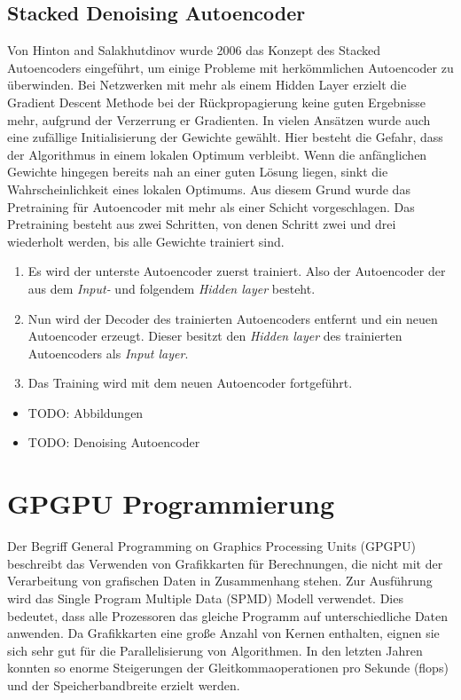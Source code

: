 \subsection{Stacked Denoising Autoencoder}

Von Hinton and Salakhutdinov wurde 2006 das Konzept des Stacked Autoencoders eingeführt, um einige Probleme mit herkömmlichen Autoencoder zu überwinden. Bei Netzwerken mit mehr als einem Hidden Layer erzielt die Gradient Descent Methode bei der Rückpropagierung keine guten Ergebnisse mehr, aufgrund der Verzerrung er Gradienten. In vielen Ansätzen wurde auch eine zufällige Initialisierung der Gewichte gewählt. Hier besteht die Gefahr, dass der Algorithmus in einem lokalen Optimum verbleibt. Wenn die anfänglichen Gewichte hingegen bereits nah an einer guten Lösung liegen, sinkt die Wahrscheinlichkeit eines lokalen Optimums. Aus diesem Grund wurde das Pretraining für Autoencoder mit mehr als einer Schicht vorgeschlagen. Das Pretraining besteht aus zwei Schritten, von denen Schritt zwei und drei wiederholt werden, bis alle Gewichte trainiert sind.

\begin{enumerate}
	\item Es wird der unterste Autoencoder zuerst trainiert. Also der Autoencoder der aus dem \textit{Input-} und folgendem \textit{Hidden layer} besteht.
	\item Nun wird der Decoder des trainierten Autoencoders entfernt und ein neuen Autoencoder erzeugt. Dieser besitzt den \textit{Hidden layer} des trainierten Autoencoders als \textit{Input layer}.
	\item Das Training wird mit dem neuen Autoencoder fortgeführt.
\end{enumerate}

\cite{sda2010}

\begin{itemize}
	\item TODO: Abbildungen
	\item TODO: Denoising Autoencoder
\end{itemize}

\section{GPGPU Programmierung}

Der Begriff General Programming on Graphics Processing Units (GPGPU) beschreibt das Verwenden von Grafikkarten für Berechnungen, die nicht mit der Verarbeitung von grafischen Daten in Zusammenhang stehen. Zur Ausführung wird das Single Program Multiple Data (SPMD) Modell verwendet. Dies bedeutet, dass alle Prozessoren das gleiche Programm auf unterschiedliche Daten anwenden. Da Grafikkarten eine große Anzahl von Kernen enthalten, eignen sie sich sehr gut für die Parallelisierung von Algorithmen. In den letzten Jahren konnten so enorme Steigerungen der Gleitkommaoperationen pro Sekunde (flops) und der Speicherbandbreite erzielt werden. 

